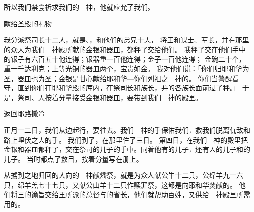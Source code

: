 {所以我们禁食祈求我们的　神，他就应允了我们。
\par }{\SH 献给圣殿的礼物
\par }{\PP {}我分派祭司长十二人，就是{}、{}，和他们的弟兄十人，
将王和谋士、军长，并在那里的{}众人为我们　神殿所献的金银和器皿，都秤了交给他们。
我秤了交在他们手中的银子有六百五十他连得；银器重一百他连得；金子一百他连得；
金碗二十个，重一千达利克；上等光铜的器皿两个，宝贵如金。
我对他们说：「你们归耶和华为圣，器皿也为圣；金银是甘心献给耶和华—你们列祖之　神的。
你们当警醒看守，直到你们在{}耶和华殿的库内，在祭司长和{}族长，并{}的各族长面前过了秤。」
于是，祭司、{}人按着分量接受金银和器皿，要带到{}我们　神的殿里。
\par }{\SH 返回耶路撒冷
\par }{\PP {}正月十二日，我们从{}边起行，要往{}去。我们　神的手保佑我们，救我们脱离仇敌和路上埋伏之人的手。
我们到了{}，在那里住了三日。
第四日，在我们　神的殿里把金银和器皿都秤了，交在祭司{}的儿子{}的手中。同着他有{}的儿子{}，还有{}人{}的儿子{}和{}的儿子{}。
当时都点了数目，按着分量写在册上。
\par }{\PP {}从掳到之地归回的人向{}的　神献燔祭，就是为{}众人献公牛十二只，公绵羊九十六只，绵羊羔七十七只，又献公山羊十二只作赎罪祭，这都是向耶和华焚献的。
他们将王的谕旨交给王所派的总督与{}的省长，他们就帮助百姓，又供给　神殿里所需用的。

}
